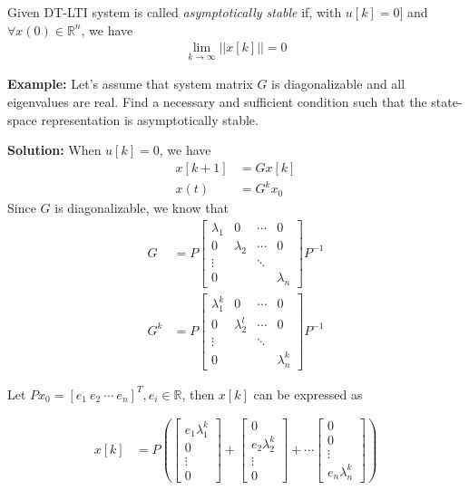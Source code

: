 \documentclass[twoside]{article}
\begin{document}
Given DT-LTI system is called \textit{asymptotically stable} if,
with $u[k] = 0]$ and $\forall x(0) \in \mathbb{R}^n$, we have
%
\begin{align*}
  \lim_{k \to \infty} || x[k] || = 0
\end{align*}

\textbf{Example:} Let's assume that system matrix $G$ is
diagonalizable
and all eigenvalues are real. Find a
necessary and sufficient condition such that the state-space
representation is asymptotically stable. 

\textbf{Solution:} When $u[k] = 0$, we have
%
\begin{align*}
x[k+1] &= G x[k]
\\
x(t) &= G^k x_0
\end{align*}
%
Since $G$ is diagonalizable, we know that
%
\begin{align*}
  G &= P \left[ \begin{array}{cccc} \lambda_1 & 0 & \cdots & 0 
\\
0 & \lambda_2 &  \cdots & 0 
\\
\vdots &  &  \ddots &  
\\
0 &  &  &  \lambda_n
\end{array} \right] P^{-1}
\\
G^k &= P \left[ \begin{array}{cccc} \lambda_1^k & 0 & \cdots & 0 
\\
0 & \lambda_2^l &  \cdots & 0 
\\
\vdots &  &  \ddots &  
\\
0 &  &  &  \lambda_n^k
\end{array} \right] P^{-1}
\end{align*}

Let $P x_0 = [e_1 \ e_2 \ \cdots \ e_n ]^T, e_i \in \mathbb{R}$, then 
$x[k]$ can be expressed as

\begin{align*}
x[k] &= P \left(
\left[ \begin{array}{c} e_1 \lambda_1^k\\ 0 \\ \vdots \\
         0 \end{array} \right]
+
\left[ \begin{array}{c} 0 \\ e_2 \lambda_2^k \\ \vdots \\
         0 \end{array} \right]
+ \cdots
\left[ \begin{array}{c} 0 \\ 0 \\ \vdots \\
         e_n \lambda_n^k \end{array} \right]
\right)
\end{align*}
\end{document}
